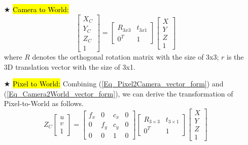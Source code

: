 \documentclass{article}
\begin{document}
\begin{itemize}
	\item [$\bigstar$] \hl{Camera to World:}	
		\begin{equation}
		\left[\begin{array}{l}
		X_C \\
		Y_C \\
		Z_C \\
		1
		\end{array}\right]=\left[\begin{array}{ll}
		R_{3x3} & t_{3x1} \\
		0^T & 1 
		\end{array}\right]\left[\begin{array}{l}
		X \\
		Y \\
		Z \\
		1
		\end{array}\right]			
		\label{Eq_Camera2World_vector_form}
		\end{equation}
		where $R$ denotes the orthogonal rotation matrix with the size of 3x3; $r$ is the 3D translation vector with the size of 3x1.
		
	\item [$\bigstar$] \hl{Pixel to World:}	Combining (\ref{Eq_Pixel2Camera_vector_form}) and (\ref{Eq_Camera2World_vector_form}), we can derive the transformation of Pixel-to-World as follows.
		\begin{equation}
		Z_C \left[\begin{array}{l}
		u \\
		v \\
		1
		\end{array}\right]=\left[\begin{array}{llll}
		f_{x} & 0 & c_{x} &0\\
		0 & f_{y} & c_{y} &0\\
		0 & 0 & 1  &0
		\end{array}\right]\left[\begin{array}{ll}
		R_{3\times 3} & t_{3\times 1} \\
		0^T & 1 
		\end{array}\right]\left[\begin{array}{l}
		X \\
		Y \\
		Z \\
		1
		\end{array}\right] 			
		\label{Eq_Pixel2World_vector_form}
		\end{equation}
\end{itemize}
\end{document}
